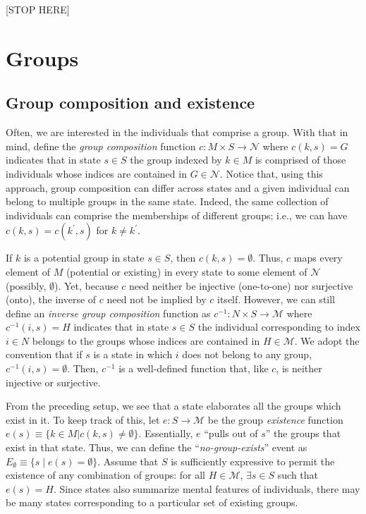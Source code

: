\documentclass[
11pt,
titlepage,
reqno,
]{article}%
\theoremstyle{definition}
\begin{document}
	
	[STOP HERE]
	
	
	
	\section{Groups}  

	 
	
	\subsection{Group composition and existence}
	Often, we are interested in the individuals that comprise a group. With that in mind, define the \textit{group composition} function $c:M\times S \rightarrow \mathcal{N}$ where $c(k,s)=G$ indicates that in state $s\in S$ the group indexed by $k\in M$ is comprised of those individuals whose indices are contained in $G\in\mathcal{N}$. Notice that, using this approach, group composition can differ across states and  a given individual can belong to multiple groups in the same state. Indeed, the same collection of individuals can comprise the memberships of different  groups; i.e., we can have $c(k,s)=c(k^\prime,s)$ for $k\ne k^\prime$.
	
	If $k$ is a potential group in state $s\in S$, then $c(k,s)=\emptyset$. Thus, $c$ maps every element of $M$ (potential or existing) in every state to some element of $\mathcal{N}$ (possibly, $\emptyset$). Yet, because $c$ need neither be injective (one-to-one) nor surjective (onto), the inverse of $c$ need not be implied by $c$ itself. However, we can still define an \textit{inverse group composition} function as $c^{-1}:N\times S \rightarrow \mathcal{M}$ where $c^{-1}(i,s)=H$ indicates that in state $s\in S$ the individual corresponding to index $i\in N$ belongs to the groups whose indices are contained in $H\in\mathcal{M}$. We adopt the convention that if $s$ is a state in which $i$ does not belong to any group, $c^{-1}(i,s)=\emptyset$. Then, $c^{-1}$ is a well-defined function that, like $c$, is neither injective or surjective.
	
	From the preceding setup, we see that a state elaborates all the groups which exist in it. To keep track of this, let $e:S \rightarrow \mathcal{M}$ be the group \textit{existence} function  $e(s)\equiv\{k\in M|c(k,s)\ne \emptyset\}$.  Essentially, $e$  ``pulls out of $s$'' the groups that exist in that state.   Thus, we can define the ``\textit{no-group-exists}'' event as   $E_\emptyset\equiv\{s\mid e(s)=\emptyset\}$. Assume that $S$ is sufficiently expressive to permit the existence of any combination of groups: for all $H\in\mathcal{M}$, $\exists s\in S$ such that $e(s)=H$. Since states also summarize mental features of individuals, there may be many states corresponding to a particular set of existing groups. %
	
\end{document}
